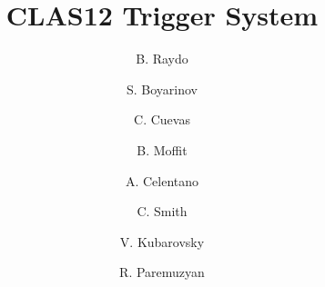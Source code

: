 \title{CLAS12 Trigger System}

\author[A]{B. Raydo}
\author[A]{S. Boyarinov}
\author[A]{C. Cuevas}
\author[A]{B. Moffit}
\author[B]{A. Celentano}
\author[A]{C. Smith}
\author[A]{V. Kubarovsky}
\author[A]{R. Paremuzyan}

\address[A]{Thomas Jefferson National Accelerator Facility, Newport News, VA, USA}
\address[B]{INFN, Milan, Italy}

